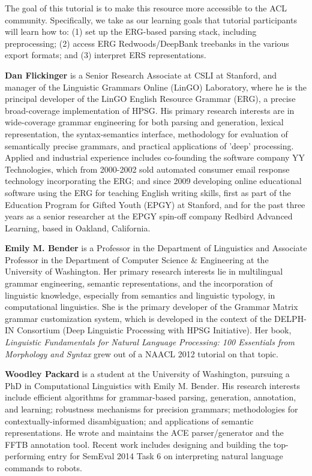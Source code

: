 \begin{tutorial}
The goal of this tutorial is to make this resource more accessible to the ACL community. Specifically, we take as our learning goals that tutorial participants will learn how to: (1) set up the ERG-based parsing stack, including preprocessing; (2) access ERG Redwoods/DeepBank treebanks in the various export formats; and (3) interpret ERS representations.

\end{tutorial}

\begin{bio}
  {\bfseries Dan Flickinger} is a Senior Research Associate at CSLI at Stanford, and manager of the Linguistic Grammars Online (LinGO) Laboratory, where he is the principal developer of the LinGO English Resource Grammar (ERG), a precise broad-coverage implementation of HPSG. His primary research interests are in wide-coverage grammar engineering for both parsing and generation, lexical representation, the syntax-semantics interface, methodology for evaluation of semantically precise grammars, and practical applications of 'deep' processing. Applied and industrial experience includes co-founding the software company YY Technologies, which from 2000-2002 sold automated consumer email response technology incorporating the ERG; and since 2009 developing online educational software using the ERG for teaching English writing skills, first as part of the Education Program for Gifted Youth (EPGY) at Stanford, and for the past three years as a senior researcher at the EPGY spin-off company Redbird Advanced Learning, based in Oakland, California.

  {\bfseries Emily M. Bender} is a Professor in the Department of Linguistics and Associate Professor in the Department of Computer Science \& Engineering at the University of Washington. Her primary research interests lie in multilingual grammar engineering, semantic representations, and the incorporation of linguistic knowledge, especially from semantics and linguistic typology, in computational linguistics. She is the primary developer of the Grammar Matrix grammar customization system, which is developed in the context of the DELPH-IN Consortium (Deep Linguistic Processing with HPSG Initiative). Her book, \emph{Linguistic Fundamentals for Natural Language Processing: 100 Essentials from Morphology and Syntax} grew out of a NAACL 2012 tutorial on that topic.

  {\bfseries Woodley Packard} is a student at the University of Washington, pursuing a PhD in Computational Linguistics with Emily M. Bender. His research interests include efficient algorithms for grammar-based parsing, generation, annotation, and learning; robustness mechanisms for precision grammars; methodologies for contextually-informed disambiguation; and applications of semantic representations. He wrote and maintains the ACE parser/generator and the FFTB annotation tool. Recent work includes designing and building the top-performing entry for SemEval 2014 Task 6 on interpreting natural language commands to robots.

\end{bio}


